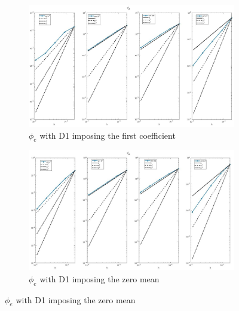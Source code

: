 \documentclass[a4paper,11pt]{article}
\begin{document}
\begin{figure}[H]
\caption{Comparison of the extracellular potential ($\phi_e$)}
\label{phie-unique}
\begin{subfigure}{\textwidth}
\begin{center}
\includegraphics[width = \textwidth]{./D1_Phie_1.jpg}
\caption{$\phi_e$ with D1 imposing the first coefficient}
\end{center}
\end{subfigure}
\begin{subfigure}{\textwidth}
\begin{center}
\includegraphics[width =\textwidth]{./D1_Phie_2.jpg}
\caption{$\phi_e$ with D1 imposing the zero mean}
\end{center}
\end{subfigure}
\end{figure}
\newpage
\end{document}
